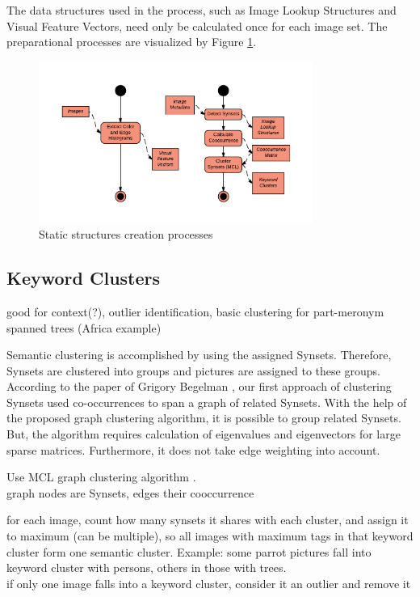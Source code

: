 The data structures used in the process, such as Image Lookup Structures and Visual Feature Vectors, need only be calculated once for each image set. The preparational processes are visualized by Figure \ref{fig_precalcprocess}.

\begin{figure}[h]
\centering
\includegraphics[width=0.8\textwidth]{images/precalcs_activity_diagram.pdf}
\caption{Static structures creation processes}
\label{fig_precalcprocess}
\end{figure}


\subsection{Keyword Clusters}
\label{sec_keywordclustering}
good for context(?), outlier identification, basic clustering for part-meronym spanned trees (Africa example)

\bigskip
Semantic clustering is accomplished by using the assigned Synsets. Therefore, Synsets are clustered into groups and pictures are assigned to these groups. According to the paper of Grigory Begelman \cite{begelman2006automated}, our first approach of clustering Synsets used co-occurrences to span a graph of related Synsets. With the help of the proposed graph clustering algorithm, it is possible to group related Synsets. But, the algorithm requires calculation of eigenvalues and eigenvectors for large sparse matrices. Furthermore, it does not take edge weighting into account.

Use MCL graph clustering algorithm\cite{Dongen1998} .\\
graph nodes are Synsets, edges their cooccurrence

\bigskip
for each image, count how many synsets it shares with each cluster, and assign it to maximum (can be multiple), so all images with maximum tags in that keyword cluster form one semantic cluster. Example: some parrot pictures fall into keyword cluster with persons, others in those with trees. \\
if only one image falls into a keyword cluster, consider it an outlier and remove it


